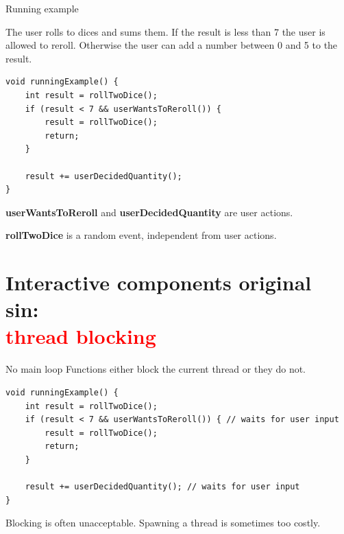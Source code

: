 \documentclass[aspectratio=169,11pt]{beamer}
\begin{document}




\begin{frame}[fragile]{Running example}

The user rolls to dices and sums them. If the result is less than 7 the user is allowed to reroll. Otherwise the user can add a number between 0 and 5 to the result. 

\begin{lstlisting}[style=cppstyle]
void runningExample() {
    int result = rollTwoDice();
    if (result < 7 && userWantsToReroll()) {
        result = rollTwoDice();
        return;
    }

    result += userDecidedQuantity();
}
\end{lstlisting}


\textbf{userWantsToReroll} and \textbf{userDecidedQuantity} are user actions.

\textbf{rollTwoDice} is a random event, independent from user actions. 
\end{frame}


\section{Interactive components original sin: \\ \noindent \textcolor{red}{thread blocking}}
\begin{frame}[fragile]{No main loop}
    Functions either block the current thread or they do not. 

\begin{lstlisting}[style=cppstyle]
void runningExample() {
    int result = rollTwoDice();
    if (result < 7 && userWantsToReroll()) { // waits for user input
        result = rollTwoDice();
        return;
    }

    result += userDecidedQuantity(); // waits for user input
}
\end{lstlisting}
    Blocking is often unacceptable. Spawning a thread is sometimes too costly.
\end{frame}
\end{document}
